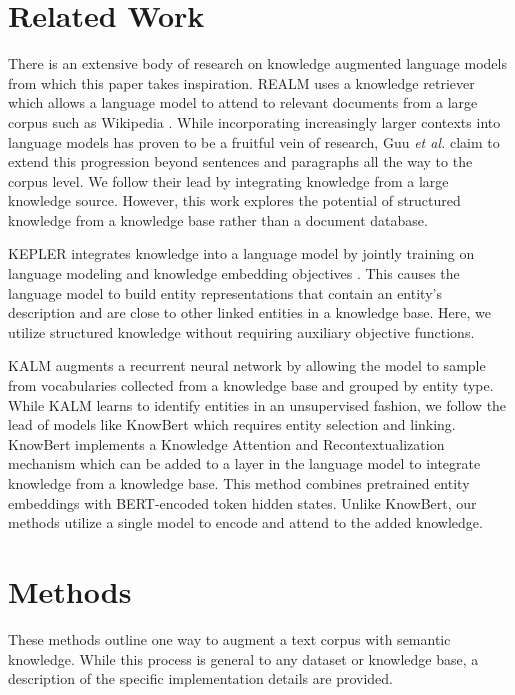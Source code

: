 \documentclass[phd,electronic,oneside,twosidetoc,letterpaper,chaptercenter,parttop,lof]{byumsphd}
\begin{document}
\section{Related Work}

There is an extensive body of research on knowledge augmented language models from which this paper takes inspiration.
REALM uses a knowledge retriever which allows a language model to attend to relevant documents from a large corpus such as Wikipedia \cite{guu2020realm}. 
While incorporating increasingly larger contexts into language models has proven to be a fruitful vein of research, Guu \textit{et al.} claim to extend this progression beyond sentences and paragraphs all the way to the corpus level. 
We follow their lead by integrating knowledge from a large knowledge source.
However, this work explores the potential of structured knowledge from a knowledge base rather than a document database.

KEPLER integrates knowledge into a language model by jointly training on language modeling and knowledge embedding objectives \cite{wang2021kepler}.
This causes the language model to build entity representations that contain an entity's description and are close to other linked entities in a knowledge base.
Here, we utilize structured knowledge without requiring auxiliary objective functions.

KALM augments a recurrent neural network \cite{liu2019knowledge} by allowing the model to sample from vocabularies collected from a knowledge base and grouped by entity type.
While KALM learns to identify entities in an unsupervised fashion, we follow the lead of models like KnowBert \cite{peters2019knowledge} which requires entity selection and linking. 
KnowBert implements a Knowledge Attention and Recontextualization
mechanism which can be added to a layer in the language model to integrate knowledge from a knowledge base.
This method combines pretrained entity embeddings with BERT-encoded token hidden states.
Unlike KnowBert, our methods utilize a single model to encode and attend to the added knowledge.

\section{Methods}

These methods outline one way to augment a text corpus with semantic knowledge.
While this process is general to any dataset or knowledge base, a description of the specific implementation details are provided.
    
\end{document}
